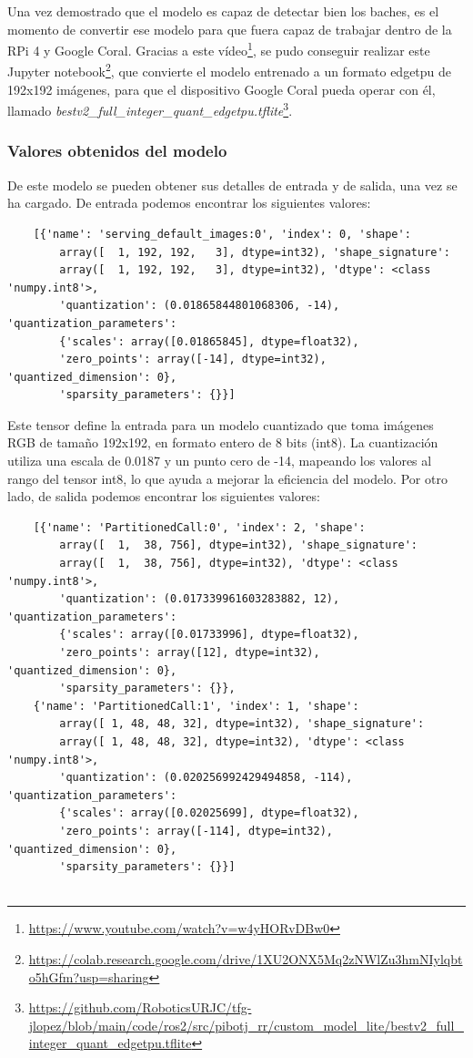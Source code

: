 Una vez demostrado que el modelo es capaz de detectar bien los baches, es el momento de convertir ese modelo para que fuera capaz de trabajar dentro de la RPi 4 y Google Coral. Gracias a este vídeo\footnote{\url{https://www.youtube.com/watch?v=w4yHORvDBw0}}, se pudo conseguir realizar este Jupyter notebook\footnote{\url{https://colab.research.google.com/drive/1XU2ONX5Mq2zNWlZu3hmNIylqbto5hGfm?usp=sharing}}, que convierte el modelo entrenado a un formato edgetpu de 192x192 imágenes, para que el dispositivo Google Coral pueda operar con él, llamado \textit{bestv2\_full\_integer\_quant\_edgetpu.tflite}\footnote{\url{https://github.com/RoboticsURJC/tfg-jlopez/blob/main/code/ros2/src/pibotj_rr/custom_model_lite/bestv2_full_integer_quant_edgetpu.tflite}}.

\subsubsection{Valores obtenidos del modelo}
\label{subsec:valoresmodelotflite}

De este modelo se pueden obtener sus detalles de entrada y de salida, una vez se ha cargado. De entrada podemos encontrar los siguientes valores: 

\begin{verbatim}
	[{'name': 'serving_default_images:0', 'index': 0, 'shape': 
		array([  1, 192, 192,   3], dtype=int32), 'shape_signature': 
		array([  1, 192, 192,   3], dtype=int32), 'dtype': <class 'numpy.int8'>, 
		'quantization': (0.01865844801068306, -14), 'quantization_parameters': 
		{'scales': array([0.01865845], dtype=float32), 
		'zero_points': array([-14], dtype=int32), 'quantized_dimension': 0}, 
		'sparsity_parameters': {}}]
\end{verbatim}

Este tensor define la entrada para un modelo cuantizado que toma imágenes RGB de tamaño 192x192, en formato entero de 8 bits (int8). La cuantización utiliza una escala de 0.0187 y un punto cero de -14, mapeando los valores al rango del tensor int8, lo que ayuda a mejorar la eficiencia del modelo. Por otro lado, de salida podemos encontrar los siguientes valores: 

\begin{verbatim}
	[{'name': 'PartitionedCall:0', 'index': 2, 'shape': 
		array([  1,  38, 756], dtype=int32), 'shape_signature': 
		array([  1,  38, 756], dtype=int32), 'dtype': <class 'numpy.int8'>,
		'quantization': (0.017339961603283882, 12), 'quantization_parameters':
		{'scales': array([0.01733996], dtype=float32), 
		'zero_points': array([12], dtype=int32), 'quantized_dimension': 0},
	  	'sparsity_parameters': {}},
	{'name': 'PartitionedCall:1', 'index': 1, 'shape': 
		array([ 1, 48, 48, 32], dtype=int32), 'shape_signature': 
		array([ 1, 48, 48, 32], dtype=int32), 'dtype': <class 'numpy.int8'>, 
		'quantization': (0.020256992429494858, -114), 'quantization_parameters': 
		{'scales': array([0.02025699], dtype=float32), 
		'zero_points': array([-114], dtype=int32), 'quantized_dimension': 0},
		'sparsity_parameters': {}}]
		
\end{verbatim}


